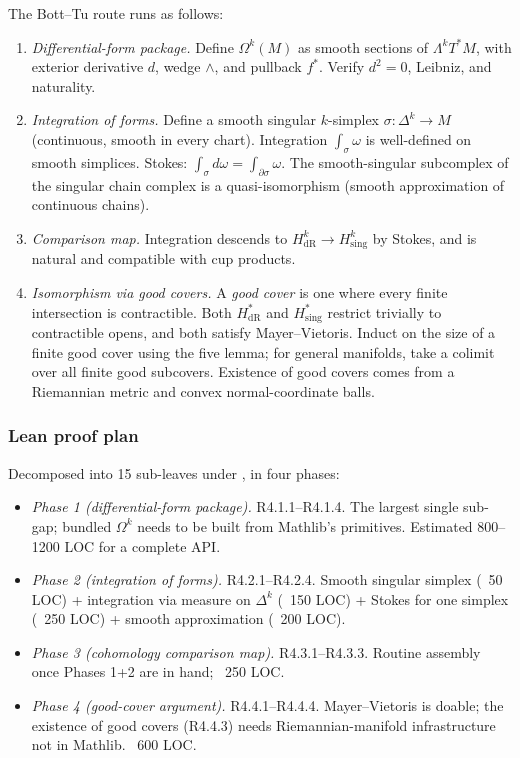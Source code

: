 The Bott--Tu route runs as follows:

\begin{enumerate}
\item \emph{Differential-form package.}  Define \(\Omega^k(M)\) as
  smooth sections of \(\Lambda^k T^*M\), with exterior derivative
  \(d\), wedge \(\wedge\), and pullback \(f^*\).  Verify
  \(d^2 = 0\), Leibniz, and naturality.
\item \emph{Integration of forms.}  Define a smooth singular
  \(k\)-simplex \(\sigma : \Delta^k \to M\) (continuous, smooth in
  every chart).  Integration \(\int_\sigma \omega\) is well-defined
  on smooth simplices.  Stokes:
  \(\int_\sigma d\omega = \int_{\partial \sigma} \omega\).  The
  smooth-singular subcomplex of the singular chain complex is a
  quasi-isomorphism (smooth approximation of continuous chains).
\item \emph{Comparison map.}  Integration descends to
  \(H^k_{\mathrm{dR}} \to H^k_{\mathrm{sing}}\) by Stokes, and is
  natural and compatible with cup products.
\item \emph{Isomorphism via good covers.}  A \emph{good cover} is
  one where every finite intersection is contractible.  Both
  \(H^*_{\mathrm{dR}}\) and \(H^*_{\mathrm{sing}}\) restrict
  trivially to contractible opens, and both satisfy
  Mayer--Vietoris.  Induct on the size of a finite good cover
  using the five lemma; for general manifolds, take a colimit
  over all finite good subcovers.  Existence of good covers comes
  from a Riemannian metric and convex normal-coordinate balls.
\end{enumerate}

\subsubsection*{Lean proof plan}

Decomposed into 15 sub-leaves under
, in four phases:

\begin{itemize}
\item \emph{Phase 1 (differential-form package).}  R4.1.1--R4.1.4.
  The largest single sub-gap; bundled \(\Omega^k\) needs to be built
  from Mathlib's  primitives.  Estimated 800--1200
  LOC for a complete API.
\item \emph{Phase 2 (integration of forms).}  R4.2.1--R4.2.4.
  Smooth singular simplex (~50 LOC) + integration via measure on
  \(\Delta^k\) (~150 LOC) + Stokes for one simplex (~250 LOC) +
  smooth approximation (~200 LOC).
\item \emph{Phase 3 (cohomology comparison map).}  R4.3.1--R4.3.3.
  Routine assembly once Phases 1+2 are in hand; ~250 LOC.
\item \emph{Phase 4 (good-cover argument).}  R4.4.1--R4.4.4.
  Mayer--Vietoris is doable; the existence of good covers (R4.4.3)
  needs Riemannian-manifold infrastructure not in Mathlib.  ~600 LOC.
\end{itemize}

